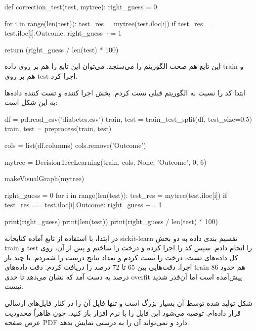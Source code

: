 \documentclass[12pt,titlepage,a4page , tikz , multi,table , svgnames,xcdraw]{article}
\begin{document}
\begin{latin}
\begin{python}
def correction_test(test, mytree):
    right_guess = 0

    for i in range(len(test)):
        test_res = mytree(test.iloc[i])
        if test_res == test.iloc[i].Outcome:
            right_guess += 1

    return (right_guess / len(test) * 100)

\end{python}


\end{latin}


این تابع هم صحت الگوریتم را می‌سنجد. می‌توان این تابع را هم بر روی داده train و هم بر روی test اجرا کرد.

ابتدا کد را نسبت به الگوریتم قبلی تست کردم. بخش اجرا کننده و تست کننده داده‌ها به این شکل است:

  \begin{latin}
\begin{python}[language=Python]


df = pd.read_csv('diabetes.csv')
train, test = train_test_split(df, test_size=0.5)
train, test = preprocess(train, test)

cols = list(df.columns)
cols.remove('Outcome')

mytree = DecisionTreeLearning(train, cols, None, 'Outcome', 0, 6)

makeVisualGraph(mytree)

right_guess = 0
for i in range(len(test)):
    test_res = mytree(test.iloc[i])
    if test_res == test.iloc[i].Outcome:
        right_guess += 1

print(right_guess)
print(len(test))
print(right_guess / len(test) * 100)

\end{python}

\end{latin}


در ابتدا، با استفاده از تابع آماده کتابخانه sickit-learn تقسیم بندی داده به دو بخش train و test را انجام دادم. سپس کد را اجرا کرده و درخت را ساختم و پس از آن، روی کل داده‌های تست، درخت را تست کردم و تعداد نتایج درست را شمردم. با چند بار اجرا، دقت‌هایی بین 65 تا 72 درصد را دریافت کردم. دقت داده‌های train هم حدود 86 درصد به دست آمد که نشان می‌دهد تا حدی overfit پیش‌آمده است اما آن‌قدر شدید نیست.

شکل تولید شده توسط آن بسیار بزرگ است و تنها فایل آن را در کنار فایل‌های ارسالی قرار داده‌ام. توصیه می‌شود این فایل را با نرم افزار  باز کنید. چون ظاهراً  محدودیت عرض صفحه PDF دارد و نمی‌تواند آن را به درستی نمایش بدهد.
\end{document}
